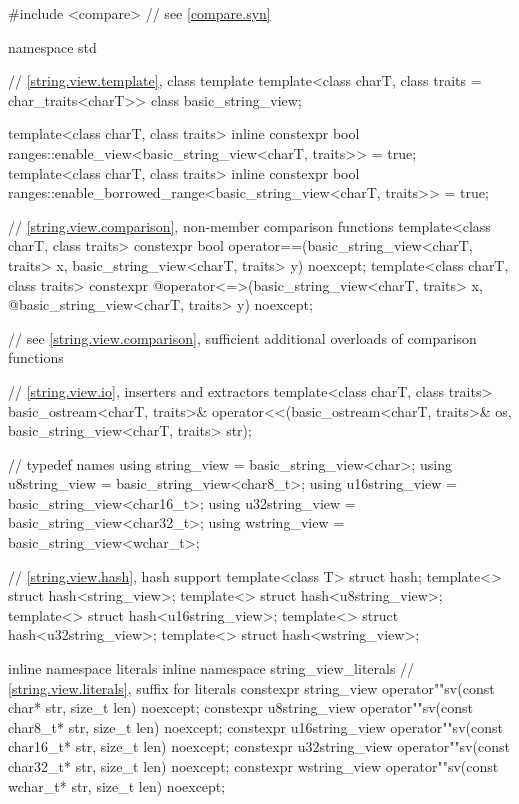 %
\begin{codeblock}
#include <compare>              // see \ref{compare.syn}

namespace std {
  // \ref{string.view.template}, class template 
  template<class charT, class traits = char_traits<charT>>
  class basic_string_view;

  template<class charT, class traits>
    inline constexpr bool ranges::enable_view<basic_string_view<charT, traits>> = true;
  template<class charT, class traits>
    inline constexpr bool ranges::enable_borrowed_range<basic_string_view<charT, traits>> = true;

  // \ref{string.view.comparison}, non-member comparison functions
  template<class charT, class traits>
    constexpr bool operator==(basic_string_view<charT, traits> x,
                              basic_string_view<charT, traits> y) noexcept;
  template<class charT, class traits>
    constexpr @\seebelow@ operator<=>(basic_string_view<charT, traits> x,
              @\itcorr@                      basic_string_view<charT, traits> y) noexcept;

  // see \ref{string.view.comparison}, sufficient additional overloads of comparison functions

  // \ref{string.view.io}, inserters and extractors
  template<class charT, class traits>
    basic_ostream<charT, traits>&
      operator<<(basic_ostream<charT, traits>& os,
                 basic_string_view<charT, traits> str);

  //  typedef names
  using string_view    = basic_string_view<char>;
  using u8string_view  = basic_string_view<char8_t>;
  using u16string_view = basic_string_view<char16_t>;
  using u32string_view = basic_string_view<char32_t>;
  using wstring_view   = basic_string_view<wchar_t>;

  // \ref{string.view.hash}, hash support
  template<class T> struct hash;
  template<> struct hash<string_view>;
  template<> struct hash<u8string_view>;
  template<> struct hash<u16string_view>;
  template<> struct hash<u32string_view>;
  template<> struct hash<wstring_view>;

  inline namespace literals {
  inline namespace string_view_literals {
    // \ref{string.view.literals}, suffix for  literals
    constexpr string_view    operator""sv(const char* str, size_t len) noexcept;
    constexpr u8string_view  operator""sv(const char8_t* str, size_t len) noexcept;
    constexpr u16string_view operator""sv(const char16_t* str, size_t len) noexcept;
    constexpr u32string_view operator""sv(const char32_t* str, size_t len) noexcept;
    constexpr wstring_view   operator""sv(const wchar_t* str, size_t len) noexcept;
  }
  }
}
\end{codeblock}


